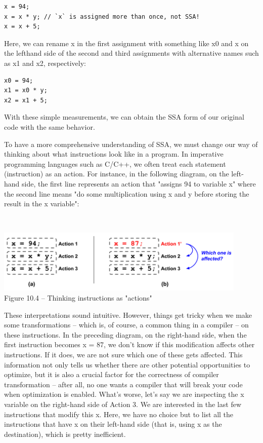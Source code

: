 \begin{lstlisting}[style=styleCXX]
x = 94;
x = x * y; // `x` is assigned more than once, not SSA!
x = x + 5;
\end{lstlisting}

Here, we can rename x in the first assignment with something like x0 and x on the lefthand side of the second and third assignments with alternative names such as x1 and x2, respectively:

\begin{lstlisting}[style=styleCXX]
x0 = 94;
x1 = x0 * y;
x2 = x1 + 5;
\end{lstlisting}

With these simple measurements, we can obtain the SSA form of our original code with the same behavior.

To have a more comprehensive understanding of SSA, we must change our way of thinking about what instructions look like in a program. In imperative programming languages such as C/C++, we often treat each statement (instruction) as an action. For instance, in the following diagram, on the left-hand side, the first line represents an action that "assigns 94 to variable x" where the second line means "do some multiplication using x and y before storing the result in the x variable":

\hspace*{\fill} \\ %
\begin{center}
\includegraphics[width=0.9\textwidth]{content/3/chapter10/images/4.png}\\
Figure 10.4 – Thinking instructions as "actions"
\end{center}

These interpretations sound intuitive. However, things get tricky when we make some transformations – which is, of course, a common thing in a compiler – on these instructions. In the preceding diagram, on the right-hand side, when the first instruction becomes x = 87, we don't know if this modification affects other instructions. If it does, we are not sure which one of these gets affected. This information not only tells us whether there are other potential opportunities to optimize, but it is also a crucial factor for the correctness of compiler transformation – after all, no one wants a compiler that will break your code when optimization is enabled. What's worse, let's say we are inspecting the x variable on the right-hand side of Action 3. We are interested in the last few instructions that modify this x. Here, we have no choice but to list all the instructions that have x on their left-hand side (that is, using x as the destination), which is pretty inefficient.

